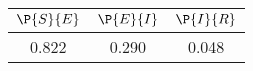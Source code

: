 \begin{tabular}{ccc}
\hline
$\P{S}{E}$&$\P{E}{I}$&$\P{I}{R}$\\
\hline
0.822&0.290&0.048\\
\hline
\end{tabular}